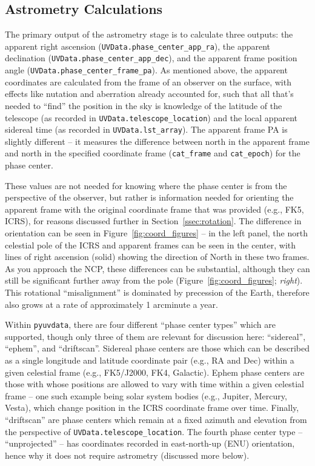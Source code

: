 \documentclass[11pt, oneside]{article}
\begin{document}
\subsection{Astrometry Calculations}\label{ssec:astrometry}
The primary output of the astrometry stage is to calculate three outputs: the apparent right ascension (\texttt{UVData.phase\_center\_app\_ra}), the apparent declination (\texttt{UVData.phase\_center\_app\_dec}), and the apparent frame position angle (\texttt{UVData.phase\_center\_frame\_pa}). As mentioned above, the apparent coordinates are calculated from the frame of an observer on the surface, with effects like nutation and aberration already accounted for, such that all that's needed to ``find'' the position in the sky is knowledge of the latitude of the telescope (as recorded in \texttt{UVData.telescope\_location}) and the local apparent sidereal time (as recorded in \texttt{UVData.lst\_array}). The apparent frame PA is slightly different -- it measures the difference between north in the apparent frame and north in the specified coordinate frame (\texttt{cat\_frame} and \texttt{cat\_epoch}) for the phase center. 

These values are not needed for knowing where the phase center is from the perspective of the observer, but rather is information needed for orienting the apparent frame with the original coordinate frame that was provided (e.g., FK5, ICRS),  for reasons discussed further in Section~\ref{ssec:rotation}. The difference in orientation can be seen in Figure~\ref{fig:coord_figures} -- in the left panel, the north celestial pole of the ICRS and apparent frames can be seen in the center, with lines of right ascension (solid) showing the direction of North in these two frames. As you approach the NCP, these differences can be substantial, although they can still be significant further away from the pole (Figure~\ref{fig:coord_figures}; \emph{right}). This rotational ``misalignment'' is dominated by precession of the Earth, therefore also grows at a rate of approximately 1 arcminute a year.

Within \texttt{pyuvdata}, there are four different ``phase center types'' which are supported, though only three of them are relevant for discussion here: ``sidereal'', ``ephem'', and ``driftscan''.  Sidereal phase centers are those which can be described as a single longitude and latitude coordinate pair (e.g., RA and Dec) within a given celestial frame (e.g., FK5/J2000, FK4, Galactic). Ephem phase centers are those with whose positions are allowed to vary with time within a given celestial frame -- one such example being solar system bodies (e.g., Jupiter, Mercury, Vesta), which change position in the ICRS coordinate frame over time. Finally, ``driftscan'' are phase centers which remain at a fixed azimuth and elevation from the perspective of \texttt{UVData.telescope\_location}. The fourth phase center type -- ``unprojected'' -- has coordinates recorded in east-north-up (ENU) orientation, hence why it does not require astrometry (discussed more below).
\end{document}
